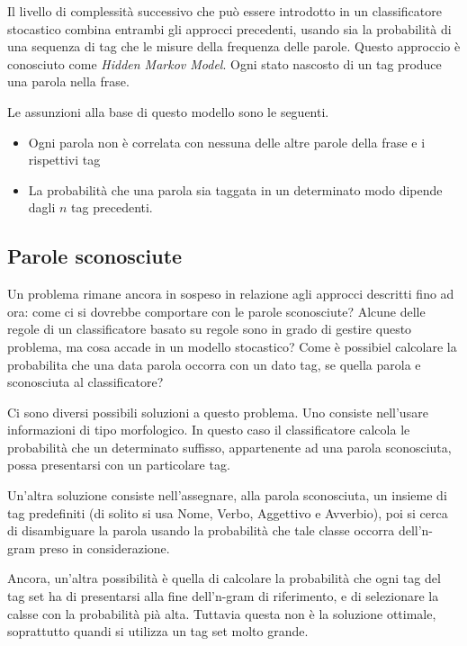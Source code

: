 Il livello di complessit\`a successivo che pu\`o essere introdotto in un classificatore stocastico combina entrambi gli approcci precedenti, usando sia la probabilit\`a di una sequenza di tag che le misure della frequenza delle parole.
Questo approccio \`e conosciuto come \emph{Hidden Markov Model}.
Ogni stato nascosto di un tag produce una parola nella frase.

Le assunzioni alla base di questo modello sono le seguenti.

\begin{itemize}
  \item Ogni parola non \`e correlata con nessuna delle altre parole della frase e i rispettivi tag
  \item La probabilit\`a che una parola sia taggata in un determinato modo dipende dagli $n$ tag precedenti.
\end{itemize}

\subsection{Parole sconosciute}

Un problema rimane ancora in sospeso in relazione agli approcci descritti fino ad ora: come ci si dovrebbe comportare con le parole sconosciute?
Alcune delle regole di un classificatore basato su regole sono in grado di gestire questo problema, ma cosa accade in un modello stocastico?
Come \`e possibiel calcolare la probabilita che una data parola occorra con un dato tag, se quella parola e sconosciuta al classificatore?

Ci sono diversi possibili soluzioni a questo problema.
Uno consiste nell'usare informazioni di tipo morfologico.
In questo caso il classificatore calcola le probabilit\`a che un determinato suffisso, appartenente ad una parola sconosciuta, possa presentarsi con un particolare tag.

Un'altra soluzione consiste nell'assegnare, alla parola sconosciuta, un insieme di tag predefiniti (di solito si usa Nome, Verbo, Aggettivo e Avverbio), poi si cerca di disambiguare la parola usando la probabilit\`a che tale classe occorra dell'n-gram preso in considerazione.

Ancora, un'altra possibilit\`a \`e quella di calcolare la probabilit\`a che ogni tag del tag set ha di presentarsi alla fine dell'n-gram di riferimento, e di selezionare la calsse con la probabilit\`a pi\`a alta.
Tuttavia questa non \`e la soluzione ottimale, soprattutto quandi si utilizza un tag set molto grande.

